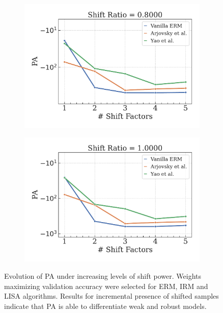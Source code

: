 \begin{figure}[H]
    \begin{subfigure}[b]{0.3\textwidth}
        \centering
        \includegraphics[width=\textwidth]{img/results_discussion/datashift/shift_ratio=0.800.pdf}
    \end{subfigure}
    \hspace{13pt}
    \begin{subfigure}[b]{0.3\textwidth}
        \centering
        \includegraphics[width=\textwidth]{img/results_discussion/datashift/shift_ratio=1.000.pdf}
    \end{subfigure}

    \caption{Evolution of PA under increasing levels of shift power. Weights maximizing validation
    accuracy were selected for ERM, IRM and LISA algorithms. Results for incremental presence of shifted
    samples indicate that PA is able to differentiate weak and robust models.
    }
    \label{fig:six_figures}
\end{figure}

